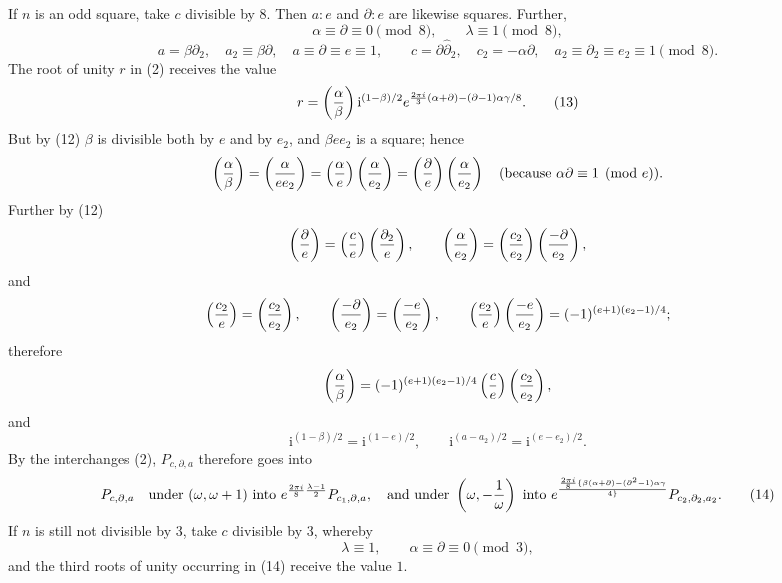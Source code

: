 \documentclass[11pt]{article}
\providecommand{\ii}{\mathrm{i}}
\begin{document}
If $n$ is an odd square, take $c$ divisible by $8$. Then $a:e$ and $\partial:e$ are likewise squares. Further,
\begin{equation}
 \alpha\equiv\partial\equiv0\pmod8,
 \qquad
 \lambda\equiv1\pmod8,
\tag{11}
\end{equation}
\begin{equation}
 a=\beta\partial_2,
 \quad a_2\equiv\beta\partial,
 \quad a\equiv\partial\equiv e\equiv1,
 \qquad
 c=\partial\hat\partial_2,
 \quad c_2=-\alpha\partial,
 \quad a_2\equiv\partial_2\equiv e_2\equiv1
 \pmod8.
\tag{12}
\end{equation}
The root of unity $r$ in (2) receives the value
\begin{equation}
 r=\left({\alpha\over\beta}\right)
 \ii^{(1-\beta)/2}e^{{2\pi i\over3}(\alpha+\partial)-(\partial-1)\alpha\gamma/8}.
\tag{13}
\end{equation}
But by (12) $\beta$ is divisible both by $e$ and by $e_2$, and $\beta e e_2$ is a square; hence
\[
 \left({\alpha\over\beta}\right)=\left({\alpha\over ee_2}\right)
 =\left({\alpha\over e}\right)
 \left({\alpha\over e_2}\right)
 =\left({\partial\over e}\right)
 \left({\alpha\over e_2}\right)
 \quad(\hbox{because }\alpha\partial\equiv1\pmod e).
\]
Further by (12)
\[
 \left({\partial\over e}\right)=\left({c\over e}\right)
 \left({\partial_2\over e}\right),
 \qquad
 \left({\alpha\over e_2}\right)=\left({c_2\over e_2}\right)
 \left({-\partial\over e_2}\right),
\]
and
\[
 \left({c_2\over e}\right)=\left({c_2\over e_2}\right),
 \qquad
 \left({-\partial\over e_2}\right)=\left({-e\over e_2}\right),
 \qquad
 \left({e_2\over e}\right)
 \left({-e\over e_2}\right)=(-1)^{(e+1)(e_2-1)/4};
\]
therefore
\[
 \left({\alpha\over\beta}\right)=
 (-1)^{(e+1)(e_2-1)/4}
 \left({c\over e}\right)\left({c_2\over e_2}\right),
\]
and
\[
 \ii^{(1-\beta)/2}=\ii^{(1-e)/2},
 \qquad
 \ii^{(a-a_2)/2}=\ii^{(e-e_2)/2}.
\]
By the interchanges (2), $P_{c,\partial,a}$ therefore goes into
\begin{equation}
 P_{c,\partial,a}\quad\hbox{under }(\omega,\omega+1)\hbox{ into }
 e^{{2\pi i\over8}{\lambda-1\over2}}P_{c_1,\partial,a},
 \quad
\hbox{and under }\left(\omega,-{1\over\omega}\right)\hbox{ into }
 e^{{2\pi i\over8}\{\beta(\alpha+\partial)-(\partial^2-1)\alpha\gamma\over4\}}P_{c_2,\partial_2,a_2}.
\tag{14}
\end{equation}
If $n$ is still not divisible by $3$, take $c$ divisible by $3$, whereby
\[
 \lambda\equiv1,
 \qquad
 \alpha\equiv\partial\equiv0\pmod3,
\]
and the third roots of unity occurring in (14) receive the value $1$.
\end{document}
